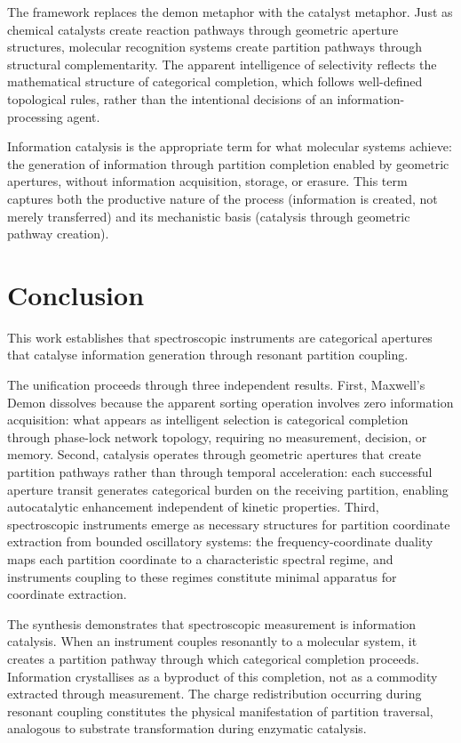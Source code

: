 \documentclass[12pt,a4paper]{article}
\theoremstyle{definition}
\theoremstyle{remark}
\begin{document}
The framework replaces the demon metaphor with the catalyst metaphor. Just as chemical catalysts create reaction pathways through geometric aperture structures, molecular recognition systems create partition pathways through structural complementarity. The apparent intelligence of selectivity reflects the mathematical structure of categorical completion, which follows well-defined topological rules, rather than the intentional decisions of an information-processing agent.

Information catalysis is the appropriate term for what molecular systems achieve: the generation of information through partition completion enabled by geometric apertures, without information acquisition, storage, or erasure. This term captures both the productive nature of the process (information is created, not merely transferred) and its mechanistic basis (catalysis through geometric pathway creation).

\section{Conclusion}
\label{sec:conclusion}

This work establishes that spectroscopic instruments are categorical apertures that catalyse information generation through resonant partition coupling.

The unification proceeds through three independent results. First, Maxwell's Demon dissolves because the apparent sorting operation involves zero information acquisition: what appears as intelligent selection is categorical completion through phase-lock network topology, requiring no measurement, decision, or memory. Second, catalysis operates through geometric apertures that create partition pathways rather than through temporal acceleration: each successful aperture transit generates categorical burden on the receiving partition, enabling autocatalytic enhancement independent of kinetic properties. Third, spectroscopic instruments emerge as necessary structures for partition coordinate extraction from bounded oscillatory systems: the frequency-coordinate duality maps each partition coordinate to a characteristic spectral regime, and instruments coupling to these regimes constitute minimal apparatus for coordinate extraction.

The synthesis demonstrates that spectroscopic measurement is information catalysis. When an instrument couples resonantly to a molecular system, it creates a partition pathway through which categorical completion proceeds. Information crystallises as a byproduct of this completion, not as a commodity extracted through measurement. The charge redistribution occurring during resonant coupling constitutes the physical manifestation of partition traversal, analogous to substrate transformation during enzymatic catalysis.
\end{document}
